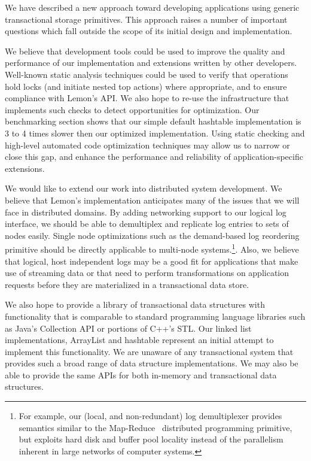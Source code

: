 \documentclass[10pt,letterpaper,twocolumn,english]{article}
\newcommand{\yad}{Lemon\xspace}
\begin{document}
We have described a new approach toward developing applications using
generic transactional storage primitives.  This approach raises a
number of important questions which fall outside the scope of its
initial design and implementation.


We believe that development tools could be used to
improve the quality and performance of our implementation and
extensions written by other developers.  Well-known static analysis
techniques could be used to verify that operations hold locks (and
initiate nested top actions) where appropriate, and to ensure
compliance with \yad's API.  We also hope to re-use the infrastructure
that implements such checks to detect opportunities for
optimization.  Our benchmarking section shows that our simple default
hashtable implementation is 3 to 4 times slower then our optimized
implementation.  Using static checking and high-level automated code
optimization techniques may allow us to narrow or close this
gap, and enhance the performance and reliability of application-specific 
extensions.

We would like to extend our work into distributed system
development.  We believe that \yad's implementation anticipates many
of the issues that we will face in distributed domains.  By adding 
networking support to our logical log interface,
we should be able to demultiplex and replicate log entries to sets of
nodes easily.  Single node optimizations such as the demand-based log
reordering primitive should be directly applicable to multi-node
systems.\footnote{For example, our (local, and non-redundant) log
demultiplexer provides semantics similar to the
Map-Reduce~\cite{mapReduce} distributed programming primitive, but
exploits hard disk and buffer pool locality instead of the parallelism
inherent in large networks of computer systems.}.  Also, we believe
that logical, host independent logs may be a good fit for applications
that make use of streaming data or that need to perform
transformations on application requests before they are materialized
in a transactional data store.

We also hope to provide a library of transactional data structures
with functionality that is comparable to standard programming language
libraries such as Java's Collection API or portions of C++'s STL.  Our
linked list implementations, ArrayList and hashtable represent an
initial attempt to implement this functionality.  We are unaware of
any transactional system that provides such a broad range of data
structure implementations.  We may also be able to provide the same
APIs for both in-memory and transactional data structures.
\end{document}
